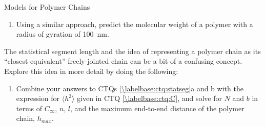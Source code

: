 \begin{activity}{Models for Polymer Chains}
\begin{exercises}
\begin{enumerate}
			\item Using a similar approach, predict the molecular weight of a polymer with a radius of gyration of 100~nm.
	
		\begin{solution}\end{solution}
		\end{enumerate}
		
	\exercise \label{\labelbase:exc:statseg} The statistical segment length and the idea of representing a polymer chain as its ``closest equivalent'' freely-jointed chain can be a bit of a confusing concept.  Explore this idea in more detail by doing the following:
	
		\begin{enumerate}
			\item Combine your answers to CTQs \ref{\labelbase:ctq:statseg}a and b with the expression for $\langle h^2\rangle$ given in CTQ \ref{\labelbase:ctq:C}, and solve for $N$ and $b$ in terms of $C_\infty$, $n$, $l$, and the maximum end-to-end distance of the polymer chain, $h_{max}$.
				
				\begin{solution}\end{solution}
			

\end{enumerate}
\end{exercises}
\end{activity}
